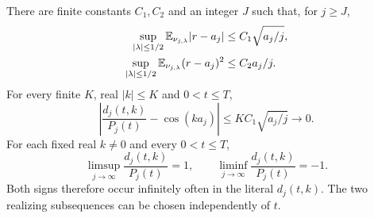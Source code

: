\begin{theorem}\label{thm:highcount}
There are finite constants $C_1,C_2$ and an integer $J$ such that, for
$j\ge J$,
\begin{equation}\label{eq:hcmoments}
 \begin{aligned}
 \sup_{|\lambda|\le1/2}\mathbb E_{\nu_{j,\lambda}}|r-a_j|
 &\le C_1\sqrt{a_j/j},\\
 \sup_{|\lambda|\le1/2}\mathbb E_{\nu_{j,\lambda}}(r-a_j)^2
 &\le C_2a_j/j.
 \end{aligned}
\end{equation}
For every finite $K$, real $|k|\le K$ and $0<t\le T$,
\begin{equation}\label{eq:hcphase}
 \left|\frac{d_j(t,k)}{P_j(t)}-\cos(ka_j)\right|
 \le KC_1\sqrt{a_j/j}\longrightarrow0.
\end{equation}
For each fixed real $k\ne0$ and every $0<t\le T$,
\begin{equation}\label{eq:hcsigns}
 \limsup_{j\to\infty}\frac{d_j(t,k)}{P_j(t)}=1,\qquad
 \liminf_{j\to\infty}\frac{d_j(t,k)}{P_j(t)}=-1.
\end{equation}
Both signs therefore occur infinitely often in the literal $d_j(t,k)$.
The two realizing subsequences can be chosen independently of $t$.
\end{theorem}
